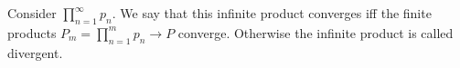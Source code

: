 \documentclass[12pt]{article}
\begin{document}
Consider $\prod_{n=1}^{\infty} p_n$. We say that this infinite product converges iff the finite products $P_m = \prod_{n=1}^{m} p_n \longrightarrow P$ converge. Otherwise the infinite product is called divergent.


\end{document}

